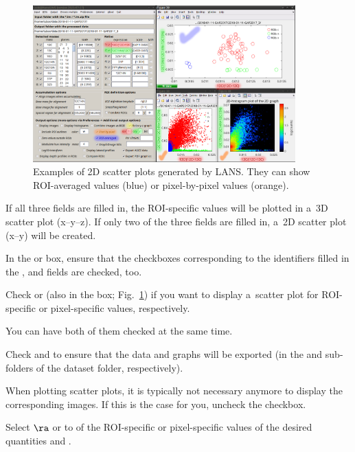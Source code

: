 \begin{figure}[!ht]
\centering
\includegraphics[width=0.9\textwidth]{figs3/LANS-scatter-plots}
\caption{\label{fig:scatter-plots}%
Examples of 2D scatter plots generated by LANS. They can show ROI-averaged values (blue) or pixel-by-pixel values (orange).}
\end{figure}
 
\nb
\bul If all three fields are filled in, the ROI-specific values will be plotted in a~3D scatter plot (x--y--z). If only two of the three fields are filled in, a~2D scatter plot (x--y) will be created.

\bul In the  or  box, ensure that the checkboxes corresponding to the identifiers filled in the ,  and  fields are checked, too. 

\s Check  or  (also in the  box; Fig.~\ref{fig:scatter-plots}) if you want to display a~scatter plot for ROI-specific or pixel-specific values, respectively.

\nb
\bul You can have both of them checked at the same time. 

\s Check  and  to ensure that the data and graphs will be exported (in the  and  sub-folders of the dataset folder, respectively).

\s When plotting scatter plots, it is typically not necessary anymore to display the corresponding images. If this is the case for you, uncheck the  checkbox.

\s Select  $\ra$  or  to  of the ROI-specific or pixel-specific values of the desired quantities and . 

